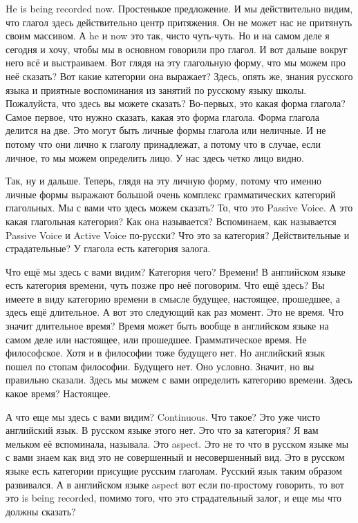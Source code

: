 \documentclass[main.tex]{subfiles}
\begin{document}
\newpage
{}

He is being recorded now.
Простенькое предложение.
И мы действительно видим, что глагол здесь действительно центр притяжения.
Он не может нас не притянуть своим массивом.
А he и now это так, чисто чуть-чуть.
Но и на самом деле я сегодня и хочу, чтобы мы в основном говорили про глагол.
И вот дальше вокруг него всё и выстраиваем.
Вот глядя на эту глагольную форму, что мы можем про неё сказать?
Вот какие категории она выражает?
Здесь, опять же, знания русского языка и приятные воспоминания из занятий по русскому языку школы.
Пожалуйста, что здесь вы можете сказать?
Во-первых, это какая форма глагола?
Самое первое, что нужно сказать, какая это форма глагола.
Форма глагола делится на две.
Это могут быть личные формы глагола или неличные.
И не потому что они лично к глаголу принадлежат, а потому что в случае, если личное, то мы можем определить лицо.
У нас здесь четко лицо видно.

Так, ну и дальше.
Теперь, глядя на эту личную форму, потому что именно личные формы выражают большой очень комплекс грамматических категорий глагольных.
Мы с вами что здесь можем сказать?
То, что это Passive Voice.
А это какая глагольная категория?
Как она называется?
Вспоминаем, как называется Passive Voice и Active Voice по-русски?
Что это за категория?
Действительные и страдательные?
У глагола есть категория залога.

Что ещё мы здесь с вами видим?
Категория чего?
Времени!
В английском языке есть категория времени, чуть позже про неё поговорим.
Что ещё здесь?
Вы имеете в виду категорию времени в смысле будущее, настоящее, прошедшее, а здесь ещё длительное.
А вот это следующий как раз момент.
Это не время.
Что значит длительное время?
Время может быть вообще в английском языке на самом деле или настоящее, или прошедшее.
Грамматическое время.
Не философское.
Хотя и в философии тоже будущего нет.
Но английский язык пошел по стопам философии.
Будущего нет.
Оно условно.
Значит, но вы правильно сказали.
Здесь мы можем с вами определить категорию времени.
Здесь какое время?
Настоящее.

А что еще мы здесь с вами видим? Continuous.
Что такое?
Это уже чисто английский язык.
В русском языке этого нет.
Это что за категория?
Я вам мельком её вспоминала, называла.
Это aspect.
Это не то что в русском языке мы с вами знаем как вид это не совершенный и несовершенный вид.
Это в русском языке есть категории присущие русским глаголам.
Русский язык таким образом развивался.
А в английском языке aspect вот если по-простому говорить, то вот это is being recorded, помимо того, что это страдательный залог, и еще мы что должны сказать?
\end{document}
